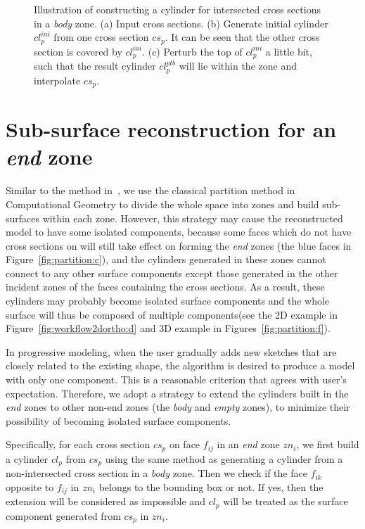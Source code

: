 \begin{figure} [htbp]
{\begin{minipage}[b]{0.3\textwidth}
    \end{minipage}}
  \caption{Illustration of constructing a cylinder for intersected cross sections
  in a \textit{body} zone.
  (a) Input cross sections.
  (b) Generate initial cylinder $cl_p^{ini}$ from one cross section $cs_p$. It can be
  seen that the other cross section is covered by $cl_p^{ini}$.
  (c) Perturb the top of $cl_p^{ini}$ a little bit, such that the result cylinder
  $cl_p^{ptb}$ will lie within the zone and interpolate $cs_p$.}
  \label{fig:csintersPerturb}
\end{figure}


\section{Sub-surface reconstruction for an \textit{end} zone}
\label{ch4:sec:algo:end}

Similar to the method in~\cite{LBDLJ08}, we use  the classical
partition method in Computational Geometry to divide the whole space
into zones and build sub-surfaces within each zone. However, this
strategy may cause the reconstructed model to have some isolated
components, because some faces which do not have cross sections on
will still take effect on forming the \textit{end} zones (the blue
faces in Figure~\ref{fig:partition:c}), and the cylinders generated
in these zones cannot connect to any other surface components except
those generated in the other incident zones of the faces containing
the cross sections. As a result, these cylinders may probably become
isolated surface components and the whole surface will thus be
composed of multiple components(see the 2D example in
Figure~\ref{fig:workflow2dortho:d} and 3D example in
Figures~\ref{fig:partition:f}).

In progressive modeling, when the user  gradually adds new sketches
that are closely related to the existing shape, the algorithm is
desired to produce a model with only one component. This is a
reasonable criterion that agrees with user's expectation. Therefore,
we adopt a strategy to extend the cylinders built in the
\textit{end} zones to other non-end zones (the \textit{body} and
\textit{empty} zones), to minimize their possibility of becoming
isolated surface components.

Specifically, for each cross  section $cs_p$ on face $f_{ij}$ in an
\textit{end} zone $zn_i$, we first build a cylinder $cl_p$ from
$cs_p$ using the same method as generating a cylinder from a
non-intersected cross section in a \textit{body} zone. Then we check
if the face $f_{ik}$ opposite to $f_{ij}$ in $zn_i$ belongs to the
bounding box or not. If yes, then the extension will be considered
as impossible and $cl_p$ will be treated as the surface component
generated from $cs_p$ in $zn_i$.


